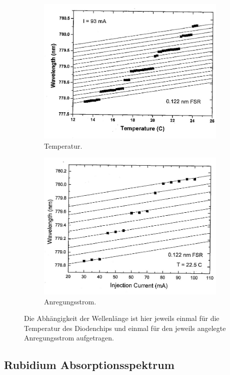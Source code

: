 \begin{figure}
    \begin{subfigure}{.5\textwidth}
      \centering
      \includegraphics[width=0.8\linewidth]{pics/temperature.jpg}  
      \caption{Temperatur.}
      \label{abb:temp}
    \end{subfigure}
    \begin{subfigure}{.5\textwidth}
      \centering
      \includegraphics[width=0.8\linewidth]{pics/current.jpg}  
      \caption{Anregungsstrom.}
      \label{abb:current}
    \end{subfigure}
    \caption{Die Abhängigkeit der Wellenlänge ist hier jeweils einmal für die Temperatur des Diodenchips und einmal für den jeweils angelegte Anregungsstrom aufgetragen. \cite{anleitung}}
\label{fig:fig}
\end{figure}



\subsection{Rubidium Absorptionsspektrum}

